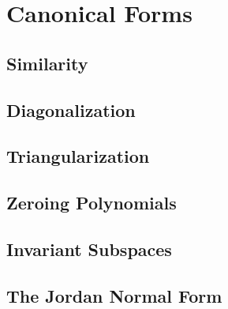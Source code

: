 \documentclass[10pt]{article}
\begin{document}
\newpage
\section{Canonical Forms}

\subsection{Similarity}



\subsection{Diagonalization}



\subsection{Triangularization}



\subsection{Zeroing Polynomials}



\subsection{Invariant Subspaces}



\subsection{The Jordan Normal Form}


\end{document}

